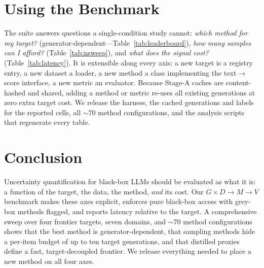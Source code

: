 \documentclass[11pt]{article}
\begin{document}
\section{Using the Benchmark}
The suite answers questions a single-condition study cannot: \emph{which method for my
target?} (generator-dependent---Table~\ref{tab:leaderboard}), \emph{how many samples can I
afford?} (Table~\ref{tab:nsweep}), and \emph{what does the signal cost?}
(Table~\ref{tab:latency}). It is extensible along every axis: a new target is a registry
entry, a new dataset a loader, a new method a class implementing the text$\to$score
interface, a new metric an evaluator. Because Stage-A caches are content-hashed and
shared, adding a method or metric re-uses all existing generations at zero extra target
cost. We release the harness, the cached generations and labels for the reported cells,
all $\sim$70 method configurations, and the analysis scripts that regenerate every table.

\section{Conclusion}
Uncertainty quantification for black-box LLMs should be evaluated as what it is: a
function of the target, the data, the method, \emph{and} its cost. Our $G\times D\to M\to
V$ benchmark makes these axes explicit, enforces pure black-box access with grey-box
methods flagged, and reports latency relative to the target. A comprehensive sweep over
four frontier targets, seven domains, and $\sim$70 method configurations shows that the
best method is generator-dependent, that sampling methods hide a per-item budget of up to
ten target generations, and that distilled proxies define a fast, target-decoupled
frontier. We release everything needed to place a new method on all four axes.
\end{document}
